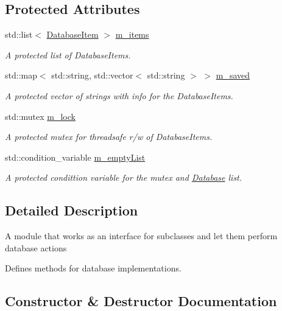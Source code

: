 \subsection*{Protected Attributes}
\begin{DoxyCompactItemize}
\item 
std\+::list$<$ \hyperlink{classDatabaseItem}{Database\+Item} $>$ \hyperlink{classDatabase_a5a4ac1f3bf0f5fd77a696174ad9e5c45}{m\+\_\+items}
\begin{DoxyCompactList}\small\item\em A protected list of Database\+Items. \end{DoxyCompactList}\item 
std\+::map$<$ std\+::string, std\+::vector$<$ std\+::string $>$ $>$ \hyperlink{classDatabase_a9f87cbe5a1be71d541083dffa8d8c9ad}{m\+\_\+saved}
\begin{DoxyCompactList}\small\item\em A protected vector of strings with info for the Database\+Items. \end{DoxyCompactList}\item 
std\+::mutex \hyperlink{classDatabase_a7f55f3a5d93c9694ee4f08a2f2135b1d}{m\+\_\+lock}
\begin{DoxyCompactList}\small\item\em A protected mutex for threadsafe r/w of Database\+Items. \end{DoxyCompactList}\item 
std\+::condition\+\_\+variable \hyperlink{classDatabase_a2ad8bf38964b3e18a0e168437acbdb27}{m\+\_\+empty\+List}
\begin{DoxyCompactList}\small\item\em A protected condittion variable for the mutex and \hyperlink{classDatabase}{Database} list. \end{DoxyCompactList}\end{DoxyCompactItemize}


\subsection{Detailed Description}


A module that works as an interface for subclasses and let them perform database actions 

Defines methods for database implementations. 

\subsection{Constructor \& Destructor Documentation}
\mbox{\label{classDatabase_a4703c80e6969d33565ea340f768fdadf}} 
